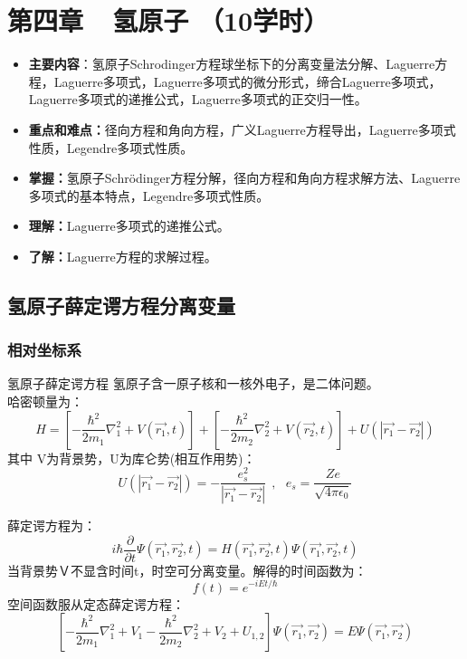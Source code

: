 
\renewcommand{\thechapter}{}
\chapter{第四章~~氢原子 （10学时）}
\renewcommand{\thechapter}{4}

\begin{itemize}
\item \textbf{主要内容}：氢原子Schrodinger方程球坐标下的分离变量法分解、Laguerre方程，Laguerre多项式，Laguerre多项式的微分形式，缔合Laguerre多项式，Laguerre多项式的递推公式，Laguerre多项式的正交归一性。
\item \textbf{重点和难点：}径向方程和角向方程，广义Laguerre方程导出，Laguerre多项式性质，Legendre多项式性质。
\item \textbf{掌握：}氢原子Schrödinger方程分解，径向方程和角向方程求解方法、Laguerre多项式的基本特点，Legendre多项式性质。
\item \textbf{理解：}Laguerre多项式的递推公式。
\item \textbf{了解：}Laguerre方程的求解过程。
\end{itemize}

\section{氢原子薛定谔方程分离变量 }

\subsection{相对坐标系}


	{氢原子薛定谔方程}
	氢原子含一原子核和一核外电子，是二体问题。\\
	{\Bullet}哈密顿量为：
	\begin{equation*}
		H=\left[-\frac{\hbar^2}{2 m_1} \nabla_1 ^2 + V(\vec{r_1},t) \right]  + \left[-\frac{\hbar^2}{2 m_2} \nabla_2 ^2 + V(\vec{r_2},t) \right]  +U(| \vec{r_1}-\vec{r_2} | )
	\end{equation*}
	其中 V为背景势，U为库仑势(相互作用势)：
	\begin{equation*}
		U(| \vec{r_1}-\vec{r_2} | )=-\frac{e_s ^2}{| \vec{r_1}-\vec{r_2} |} ~~,~~~ e_s =\frac{Ze}{\sqrt{4\pi\epsilon_0}}
	\end{equation*}



	{}
	{\Bullet}薛定谔方程为：
	\begin{equation*}
		i\hbar \frac{\partial }{\partial t} \Psi (\vec{r_1},\vec{r_2},t ) =H (\vec{r_1},\vec{r_2}, t  )  \Psi (\vec{r_1},\vec{r_2},t ) 
	\end{equation*}
	{\Bullet}当背景势Ｖ不显含时间t，时空可分离变量。解得的时间函数为：
	\begin{equation*}
		f(t) =e^{-iEt/\hbar}
	\end{equation*}
	空间函数服从定态薛定谔方程：
	\begin{equation*}
		\left[-\frac{\hbar^2}{2 m_1} \nabla_1 ^2 + V_1  -\frac{\hbar^2}{2 m_2} \nabla_2 ^2 + V_2  +U_{1,2} \right] \Psi (\vec{r_1},\vec{r_2}) =E \Psi (\vec{r_1},\vec{r_2}) 
	\end{equation*}
		


